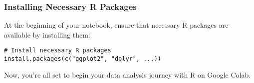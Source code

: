\documentclass[a4paper,12pt]{book}
\begin{document}
\subsubsection*{Installing Necessary R Packages}
At the beginning of your notebook, ensure that necessary R packages are available by installing them:

\begin{verbatim}
# Install necessary R packages
install.packages(c("ggplot2", "dplyr", ...))
\end{verbatim}

Now, you're all set to begin your data analysis journey with R on Google Colab.


%



\cleardoublepage %
\printbibliography
\end{document}
